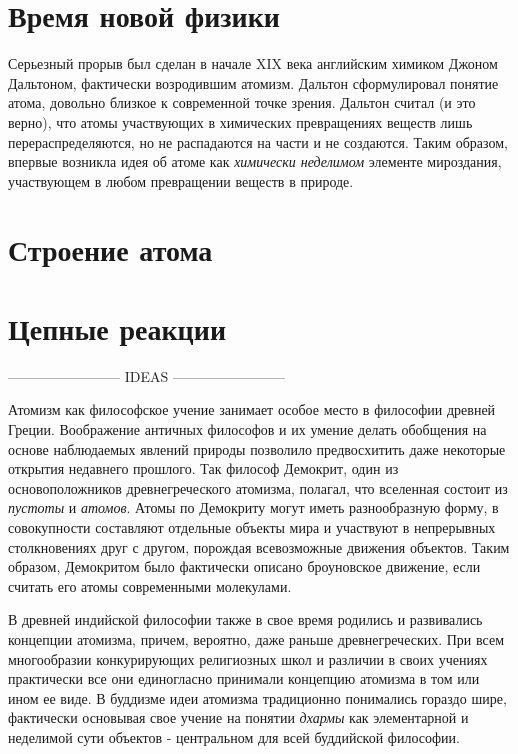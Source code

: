 \section*{Время новой физики}

Серьезный прорыв был сделан в начале XIX века английским химиком Джоном Дальтоном, фактически возродившим атомизм. 
Дальтон сформулировал понятие атома, довольно близкое к современной точке зрения. 
Дальтон считал (и это верно), что атомы участвующих в химических превращениях веществ лишь перераспределяются, но не распадаются на части и не создаются. 
Таким образом, впервые возникла идея об атоме как \textit{химически неделимом} элементе мироздания, участвующем в любом превращении веществ в природе.

\section*{Строение атома}


\section*{Цепные реакции}


------------------------ IDEAS ------------------------ 





Атомизм как философское учение занимает особое место в философии древней Греции.
Воображение античных философов и их умение делать обобщения на основе наблюдаемых явлений природы позволило предвосхитить даже некоторые открытия недавнего прошлого.
Так философ Демокрит, один из основоположников древнегреческого атомизма, полагал, что вселенная состоит из \textit{пустоты} и \textit{атомов}. Атомы по Демокриту могут иметь разнообразную форму, в совокупности составляют отдельные объекты мира и участвуют в непрерывных столкновениях друг с другом, порождая всевозможные движения объектов.
Таким образом, Демокритом было фактически описано броуновское движение, если считать его атомы современными молекулами.

В древней индийской философии также в свое время родились и развивались концепции атомизма, причем, вероятно, даже раньше древнегреческих.
При всем многообразии конкурирующих религиозных школ и различии в своих учениях практически все они единогласно принимали концепцию атомизма в том или ином ее виде.
В буддизме идеи атомизма традиционно понимались гораздо шире, фактически основывая свое учение на понятии \textit{дхармы} как элементарной и неделимой сути объектов - центральном для всей буддийской философии.




